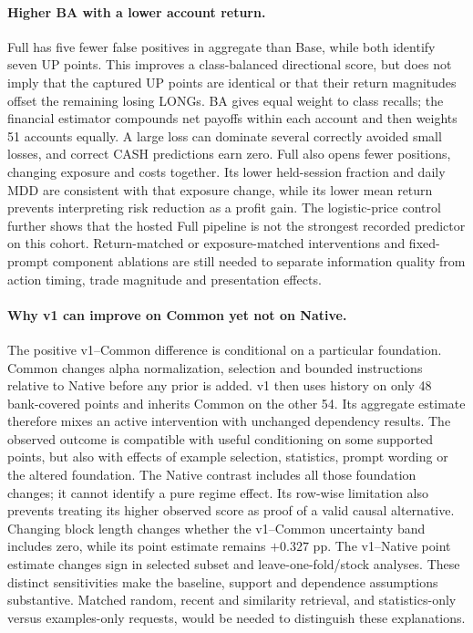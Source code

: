 \paragraph{Higher BA with a lower account return.}
Full has five fewer false positives in aggregate than Base, while both
identify seven UP points. This improves a class-balanced directional
score, but does not imply that the captured UP points are identical or
that their return magnitudes offset the remaining losing LONGs. BA gives
equal weight to class recalls; the financial estimator compounds net
payoffs within each account and then weights 51 accounts equally. A
large loss can dominate several correctly avoided small losses, and
correct CASH predictions earn zero. Full also opens fewer positions,
changing exposure and costs together. Its lower held-session fraction
and daily MDD are consistent with that exposure change, while its lower
mean return prevents interpreting risk reduction as a profit gain. The
logistic-price control further shows that the hosted Full pipeline is
not the strongest recorded predictor on this cohort. Return-matched or
exposure-matched interventions and fixed-prompt component ablations are
still needed to separate information quality from action timing, trade
magnitude and presentation effects.

\paragraph{Why v1 can improve on Common yet not on Native.}
The positive v1--Common difference is conditional on a particular
foundation. Common changes alpha normalization, selection and bounded
instructions relative to Native before any prior is added. v1 then
uses history on only 48 bank-covered points and inherits Common on the
other 54. Its aggregate estimate therefore mixes an active intervention
with unchanged dependency results. The observed outcome is compatible
with useful conditioning on some supported points, but also with effects
of example selection, statistics, prompt wording or the altered
foundation. The Native contrast includes all those foundation changes;
it cannot identify a pure regime effect. Its row-wise limitation also
prevents treating its higher observed score as proof of a valid causal
alternative. Changing block length changes whether the v1--Common
uncertainty band includes zero, while its point estimate remains
$+0.327$ pp. The v1--Native point estimate changes sign in selected subset
and leave-one-fold/stock analyses. These distinct sensitivities make the
baseline, support and dependence assumptions substantive. Matched random,
recent and similarity retrieval, and statistics-only versus examples-only
requests, would be needed to distinguish these explanations.

